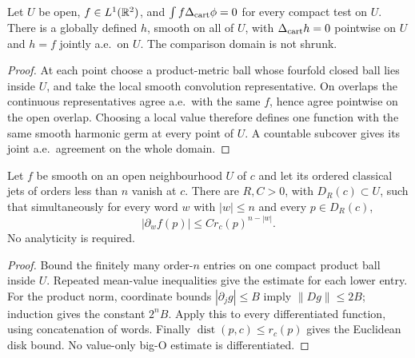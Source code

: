 \begin{lemma}
\label{lem:weak-harmonic-smooth-representative}
\leanok
Let $U$ be open, $f\in L^1(\mathbb{R}^2)$, and
$\int f\Delta_{\rm cart}\phi=0$ for every compact test on $U$.
There is a globally defined $h$, smooth on all of $U$, with
$\Delta_{\rm cart}h=0$ pointwise on $U$ and $h=f$ jointly a.e.\ on $U$.
The comparison domain is not shrunk.
\end{lemma}

\begin{proof}
\leanok
At each point choose a product-metric ball whose fourfold closed ball lies
inside $U$, and take the local smooth convolution representative.
On overlaps the continuous representatives agree a.e.\ with the same $f$,
hence agree pointwise on the open overlap.
Choosing a local value therefore defines one function with the same smooth
harmonic germ at every point of $U$.
A countable subcover gives its joint a.e.\ agreement on the whole domain.
\end{proof}

\begin{lemma}
\label{lem:classical-jet-flat-bounds}
\leanok
Let $f$ be smooth on an open neighbourhood $U$ of $c$ and let its ordered
classical jets of orders less than $n$ vanish at $c$.
There are $R,C>0$, with $D_R(c)\subset U$, such that simultaneously for
every word $w$ with $|w|\le n$ and every $p\in D_R(c)$,
\[
 |\partial_w f(p)|\le C r_c(p)^{n-|w|}.
\]
No analyticity is required.
\end{lemma}

\begin{proof}
\leanok
Bound the finitely many order-$n$ entries on one compact product ball inside
$U$. Repeated mean-value inequalities give the estimate for each lower entry.
For the product norm, coordinate bounds $|\partial_j g|\le B$ imply
$\|Dg\|\le2B$; induction gives the constant $2^n B$.
Apply this to every differentiated function, using concatenation of words.
Finally $\operatorname{dist}(p,c)\le r_c(p)$ gives the Euclidean disk bound.
No value-only big-O estimate is differentiated.
\end{proof}

